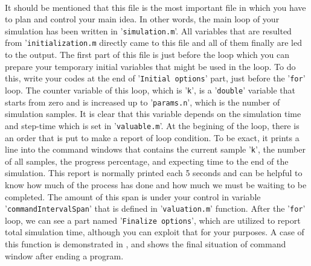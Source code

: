 {{{			\paragraph{} {
				It should be mentioned that this file is the most important file in which you have to plan and control your main idea.
				In other words, the main loop of your simulation has been written in '\texttt{simulation.m}'.
				All variables that are resulted from '\texttt{initialization.m} directly came to this file and all of them finally are led to the output.
				The first part of this file is just before the loop which you can prepare your temporary initial variables that might be used in the loop.
				To do this, write your codes at the end of '\texttt{Initial options}' part, just before the '\texttt{for}' loop.
				The counter variable of this loop, which is '\texttt{k}', is a '\texttt{double}' variable that starts from zero and is increased up to '\texttt{params.n}', which is the number of simulation samples.
				It is clear that this variable depends on the simulation time and step-time which is set in '\texttt{valuable.m}'.
				At the begining of the loop, there is an order that is put to make a report of loop condition.
				To be exact, it prints a line into the command windows that contains the current sample '\texttt{k}', the number of all samples, the progress percentage, and expecting time to the end of the simulation.
				This report is normally printed each 5 seconds and can be helpful to know how much of the process has done and how much we must be waiting to be completed.
				The amount of this span is under your control in variable '\texttt{commandIntervalSpan}' that is defined in '\texttt{valuation.m}' function.
				After the '\texttt{for}' loop, we can see a part named '\texttt{Finalize options}', which are utilized to report total simulation time, although you can exploit that for your purposes.
				A case of this function is demonstrated in , and  shows the final situation of command window after ending a program.
			}
			\begin{figure}[tbp]
\end{figure}}}}
